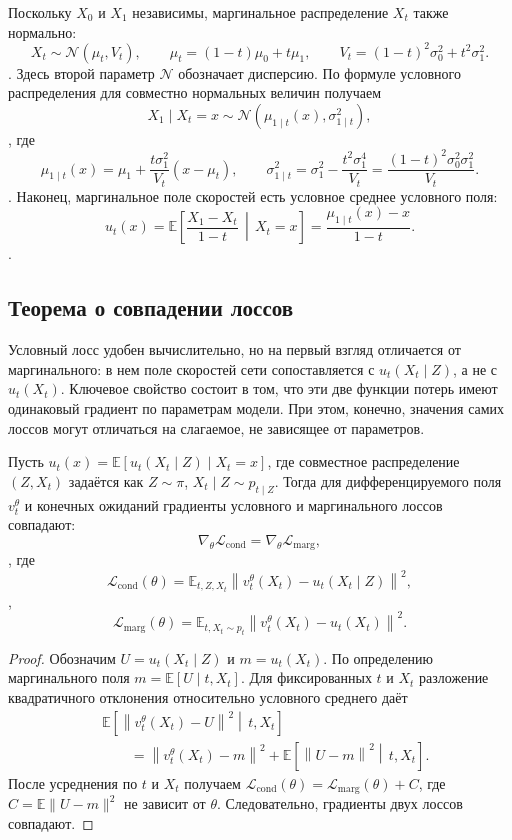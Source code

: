 Поскольку $X_0$ и $X_1$ независимы, маргинальное распределение $X_t$
также нормально:
\[
X_t
\sim\mathcal{N}(\mu_t,V_t),
\qquad
\mu_t=(1-t)\mu_0+t\mu_1,
\qquad
V_t=(1-t)^2\sigma_0^2+t^2\sigma_1^2.
\].
Здесь второй параметр $\mathcal N$ обозначает дисперсию. По формуле
условного распределения для совместно нормальных величин получаем
\[
X_1\mid X_t=x
\sim\mathcal{N}\!\left(\mu_{1\mid t}(x),\sigma_{1\mid t}^2\right),
\],
где
\[
\mu_{1\mid t}(x)
=\mu_1+\frac{t\sigma_1^2}{V_t}(x-\mu_t),
\qquad
\sigma_{1\mid t}^2
=\sigma_1^2-\frac{t^2\sigma_1^4}{V_t}
=\frac{(1-t)^2\sigma_0^2\sigma_1^2}{V_t}.
\].
Наконец, маргинальное поле скоростей есть условное среднее условного
поля:
\[
u_t(x)
=\mathbb E\!\left[
\frac{X_1-X_t}{1-t}\,\middle|\,X_t=x
\right]
=\frac{\mu_{1\mid t}(x)-x}{1-t}.
\].

\subsection{Теорема о совпадении лоссов}
Условный лосс удобен вычислительно, но на первый взгляд отличается от
маргинального: в нем поле скоростей сети сопоставляется с $u_t(X_t\mid Z)$, а не с
$u_t(X_t)$. Ключевое свойство состоит в том, что эти две функции потерь имеют одинаковый градиент
по параметрам модели. При этом, конечно, значения самих лоссов могут отличаться на
слагаемое, не зависящее от параметров.

\begin{theorem}
Пусть $u_t(x)=\mathbb E[u_t(X_t\mid Z)\mid X_t=x]$, где совместное
распределение $(Z,X_t)$ задаётся как
$Z\sim\pi$, $X_t\mid Z\sim p_{t\mid Z}$. Тогда для дифференцируемого
поля $v_t^\theta$ и конечных ожиданий градиенты условного и маргинального
лоссов совпадают:
\[
\nabla_\theta \mathcal L_{\text{cond}}
=
\nabla_\theta \mathcal L_{\text{marg}},
\],
где
\[
\mathcal L_{\text{cond}}(\theta)=
\mathbb E_{t,Z,X_t}
\left\|v_t^\theta(X_t)-u_t(X_t\mid Z)\right\|^2,
\],
\[
\mathcal L_{\text{marg}}(\theta)=
\mathbb E_{t,X_t\sim p_t}
\left\|v_t^\theta(X_t)-u_t(X_t)\right\|^2.
\]
\end{theorem}

\begin{proof}
Обозначим $U=u_t(X_t\mid Z)$ и $m=u_t(X_t)$. По определению
маргинального поля $m=\mathbb E[U\mid t,X_t]$. Для фиксированных $t$ и
$X_t$ разложение квадратичного отклонения относительно условного среднего
даёт
\begin{align*}
&\mathbb E\!\left[
\left\|v_t^\theta(X_t)-U\right\|^2
\middle|\,t,X_t\right]\\
&\qquad =
\left\|v_t^\theta(X_t)-m\right\|^2 + 
\mathbb E\!\left[\left\|U-m\right\|^2
\middle|\,t,X_t\right].
\end{align*}
После усреднения по $t$ и $X_t$ получаем
$\mathcal L_{\mathrm{cond}}(\theta)
=\mathcal L_{\mathrm{marg}}(\theta)+C$, где
$C=\mathbb E\|U-m\|^2$ не зависит от $\theta$. Следовательно, градиенты двух лоссов совпадают.
\end{proof}
